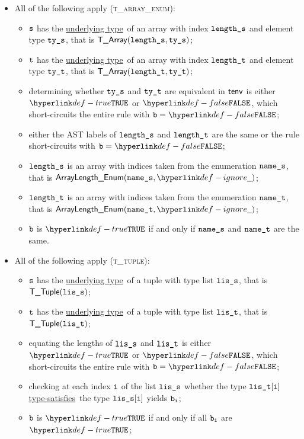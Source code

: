 \documentclass{book}
\newcommand\ProseOrTypeError[0]{\ProseTerminateAs{\TypeErrorConfig}}
\newcommand\underlyingtype[0]{\hyperlink{def-underlyingtype}{underlying type}}
\newcommand\typesatisfies[0]{\hyperlink{def-typesatisfies}{type-satisfies}}
\begin{document}
\begin{itemize}
  \item All of the following apply (\textsc{t\_array\_enum}):
  \begin{itemize}
  \item $\texttt{s}$ has the \underlyingtype\ of an array with index $\texttt{length\_s}$ and element type $\texttt{ty\_s}$, that is $\textsf{T\_Array}(\texttt{length\_s}, \texttt{ty\_s})$;
  \item $\texttt{t}$ has the \underlyingtype\ of an array with index $\texttt{length\_t}$ and element type $\texttt{ty\_t}$, that is $\textsf{T\_Array}(\texttt{length\_t}, \texttt{ty\_t})$;
  \item determining whether $\texttt{ty\_s}$ and $\texttt{ty\_t}$ are equivalent in $\textsf{tenv}$ is either $\True$
  or $\False$, which short-circuits the entire rule with $\vb=\False$;
  \item either the AST labels of $\texttt{length\_s}$ and $\texttt{length\_t}$ are the same or the rule short-circuits with $\vb=\False$;
  \item $\texttt{length\_s}$ is an array with indices taken from the enumeration $\texttt{name\_s}$, that is $\ArrayLengthEnum(\vnames, \Ignore)$;
  \item $\texttt{length\_t}$ is an array with indices taken from the enumeration $\texttt{name\_t}$, that is $\ArrayLengthEnum(\vnamet, \Ignore)$;
  \item $\texttt{b}$ is $\True$ if and only if $\texttt{name\_s}$ and $\texttt{name\_t}$ are the same.
  \end{itemize}

\item All of the following apply (\textsc{t\_tuple}):
  \begin{itemize}
  \item $\texttt{s}$ has the \underlyingtype\ of a tuple with type list $\texttt{lis\_s}$, that is $\textsf{T\_Tuple}(\texttt{lis\_s})$;
  \item $\texttt{t}$ has the \underlyingtype\ of a tuple with type list $\texttt{lis\_t}$, that is $\textsf{T\_Tuple}(\texttt{lis\_t})$;
  \item equating the lengths of $\texttt{lis\_s}$ and $\texttt{lis\_t}$ is either $\True$ or $\False$, which short-circuits
  the entire rule with $\vb=\False$;
  \item checking at each index $\texttt{i}$ of the list $\texttt{lis\_s}$ whether the type $\texttt{lis\_t}[\texttt{i}]$ \typesatisfies\ the type $\texttt{lis\_s}[\texttt{i}]$
  yields $\texttt{b}_{\texttt{i}}$\ProseOrTypeError;
  \item $\texttt{b}$ is $\True$ if and only if all $\texttt{b}_{\texttt{i}}$ are $\True$;
  \end{itemize}


\end{itemize}
\end{document}
